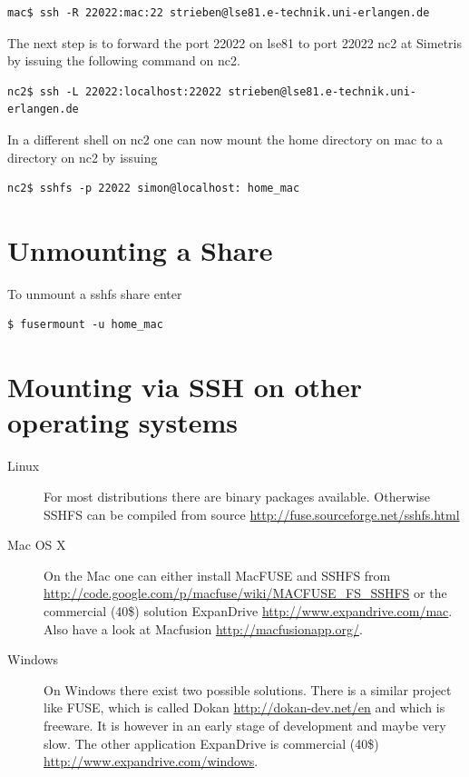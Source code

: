 \begin{verbatim}
mac$ ssh -R 22022:mac:22 strieben@lse81.e-technik.uni-erlangen.de
\end{verbatim}

The next  step is  to forward the  port 22022  on lse81 to  port 22022  nc2 at
Simetris by issuing the following command on nc2.

\begin{verbatim}
nc2$ ssh -L 22022:localhost:22022 strieben@lse81.e-technik.uni-erlangen.de
\end{verbatim}

In a different shell  on nc2 one can now mount the home  directory on mac to a
directory on nc2 by issuing

\begin{verbatim}
nc2$ sshfs -p 22022 simon@localhost: home_mac
\end{verbatim}

\section{Unmounting a Share}

To unmount a sshfs share enter

\begin{verbatim}
$ fusermount -u home_mac
\end{verbatim}

\section{Mounting via SSH on other operating systems}
\begin{description}
\item[Linux]    For   most   distributions    there   are    binary   packages
  available.    Otherwise    SSHFS     can    be    compiled    from    source
  \url{http://fuse.sourceforge.net/sshfs.html}

\item[Mac  OS X] On  the Mac  one can  either install  MacFUSE and  SSHFS from
\url{http://code.google.com/p/macfuse/wiki/MACFUSE_FS_SSHFS} or the commercial
(40\$)  solution ExpanDrive  \url{http://www.expandrive.com/mac}. Also  have a
look at Macfusion \url{http://macfusionapp.org/}.

\item[Windows]  On Windows  there exist  two  possible solutions.  There is  a
  similar     project     like     FUSE,     which     is     called     Dokan
  \url{http://dokan-dev.net/en}  and which is  freeware. It  is however  in an
  early  stage of  development  and  maybe very  slow.  The other  application
  ExpanDrive is commercial (40\$) \url{http://www.expandrive.com/windows}.
\end{description}

